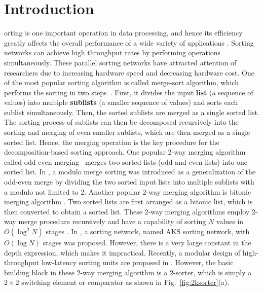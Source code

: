 \documentclass[10pt,journal,cspaper,compsoc]{IEEEtran}
\begin{document}
\section{Introduction}
orting is one important operation in data processing, and hence its efficiency greatly affects the overall performance of a wide variety of applications \cite{knuth1973art,Bat68sorting}.
Sorting networks can achieve high throughput rates by performing operations simultaneously.
These parallel sorting networks have attracted attention of researchers due to increasing hardware speed and decreasing hardware cost. One of the most popular sorting algorithm is called merge-sort algorithm, which performs the sorting in two steps~\cite{Bat68sorting}. First, it divides the input \textbf{list} (a sequence of values) into multiple \textbf{sublists} (a smaller sequence of values) and sorts each sublist simultaneously. Then, the sorted sublists are merged as a single sorted list. The sorting process of sublists can then be decomposed recursively into the sorting and merging of even smaller sublists, which are then merged as a single sorted list. Hence, the merging operation is the key procedure for the decomposition-based sorting approach.
One popular 2-way merging algorithm called odd-even merging~\cite{Bat68sorting} merges two sorted lists (odd and even lists) into one sorted list. In \cite{liszka1992modulo}, a modulo merge sorting was introduced as a generalization of the odd-even merge by dividing the two sorted input lists into multiple sublists with a modulo not limited to 2. Another popular 2-way merging algorithm is bitonic merging algorithm \cite{batcher1990bitonic}. Two sorted lists are first arranged as a bitonic list, which is then converted to obtain a sorted list.
These 2-way merging algorithms employ 2-way merge procedure recursively and have a capability of sorting $N$ values in $O(\log^2 N)$ stages \cite{Bat68sorting}.
In \cite{ajtai19830}, a sorting network, named AKS sorting network, with $O(\log N)$ stages was proposed. However, there is a very large constant in the depth expression, which makes it impractical. Recently, a modular design of high-throughput low-latency sorting units are proposed in \cite{farmahini2013modular}.
However, the basic building block in these 2-way merging algorithm is a 2-sorter, which is simply a $2\times 2$ switching element or comparator as shown in Fig.~\ref{fig:2ksorter}(a).
\end{document}
